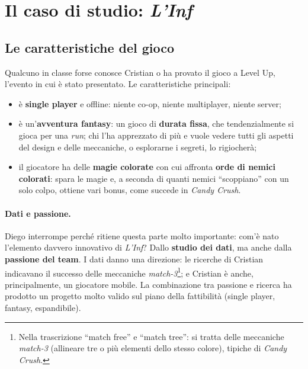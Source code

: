 \section{Il caso di studio: \emph{L'Inf}}
\label{sec:z3-linf}

\subsection{Le caratteristiche del gioco}

Qualcuno in classe forse conosce Cristian o ha provato il gioco a Level Up,
l'evento in cui è stato presentato. Le caratteristiche principali:
\begin{itemize}
  \item è \textbf{single player} e offline: niente co-op, niente
        multiplayer, niente server;
  \item è un'\textbf{avventura fantasy}: un gioco di \textbf{durata fissa}, che
        tendenzialmente si gioca per una \emph{run}; chi l'ha apprezzato di
        più e vuole vedere tutti gli aspetti del design e delle meccaniche, o
        esplorarne i segreti, lo rigiocherà;
  \item il giocatore ha delle \textbf{magie colorate} con cui affronta
        \textbf{orde di nemici colorati}: spara le magie e, a seconda di
        quanti nemici ``scoppiano'' con un solo colpo, ottiene vari bonus,
        come succede in \emph{Candy Crush}.
\end{itemize}

\paragraph{Dati e passione.} Diego interrompe perché ritiene questa parte molto
importante: com'è nato l'elemento davvero innovativo di \emph{L'Inf}? Dallo
\textbf{studio dei dati}, ma anche dalla \textbf{passione del team}. I dati
danno una direzione: le ricerche di Cristian indicavano il successo delle
meccaniche \emph{match-3}\footnote{Nella trascrizione ``match free'' e
``match tree'': si tratta delle meccaniche \emph{match-3} (allineare tre o
più elementi dello stesso colore), tipiche di \emph{Candy Crush}.}; e
Cristian è anche, principalmente, un giocatore mobile. La combinazione tra
passione e ricerca ha prodotto un progetto molto valido sul piano della
fattibilità (single player, fantasy, espandibile).

